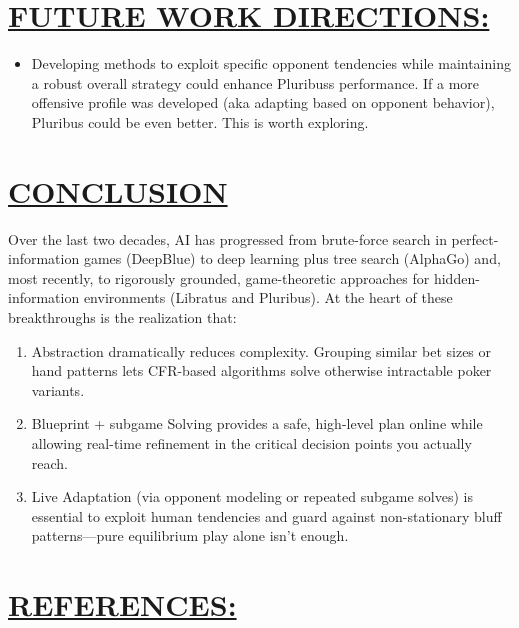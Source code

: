 \documentclass[
]{article}
\begin{document}
\section*{\texorpdfstring{\textbf{\ul{FUTURE WORK
DIRECTIONS:}}}{FUTURE WORK DIRECTIONS:}}\label{future-work-directions-1}

\begin{itemize}
\item
  Developing methods to exploit specific opponent tendencies while
  maintaining a robust overall strategy could enhance
  Pluribus\textquotesingle s performance. If a more offensive profile
  was developed (aka adapting based on opponent behavior), Pluribus
  could be even better. This is worth exploring.
\end{itemize}

\section*{\texorpdfstring{\textbf{\ul{CONCLUSION}}
}{CONCLUSION }}\label{conclusion}

Over the last two decades, AI has progressed from brute-force search in
perfect-information games (DeepBlue) to deep learning plus tree search
(AlphaGo) and, most recently, to rigorously grounded, game-theoretic
approaches for hidden-information environments (Libratus and Pluribus).
At the heart of these breakthroughs is the realization that:

\begin{enumerate}
\def\labelenumi{\arabic{enumi}.}
\item
  Abstraction dramatically reduces complexity. Grouping similar bet
  sizes or hand patterns lets CFR-based algorithms solve otherwise
  intractable poker variants.
\item
  Blueprint + subgame Solving provides a safe, high-level plan online
  while allowing real-time refinement in the critical decision points
  you actually reach.
\item
  Live Adaptation (via opponent modeling or repeated subgame solves) is
  essential to exploit human tendencies and guard against non-stationary
  bluff patterns---pure equilibrium play alone isn't enough.
\end{enumerate}

\section*{\texorpdfstring{\textbf{\ul{REFERENCES:}}}{REFERENCES:}}\label{references}
\end{document}
